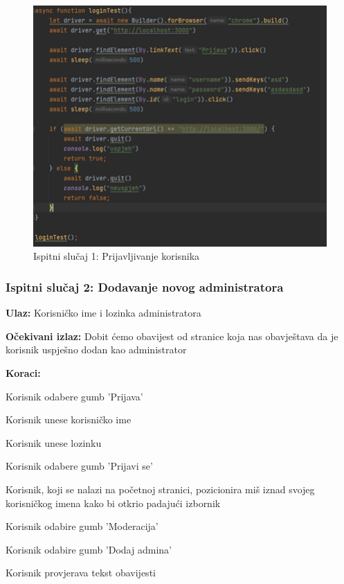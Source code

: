 			 \begin{figure}[H]
			 	\centering
			 	\includegraphics[width=12cm]{slike/prijavljivanjeKorisnika}
			 	\caption{Ispitni slučaj 1: Prijavljivanje korisnika}
			 	\label{fig:Ispitni-slucaj-1}
			 \end{figure}
		 
		 	\subsubsection{Ispitni slučaj 2: Dodavanje novog administratora}
		 	
		 	\begin{packed_item}
		 		
		 		\item \textbf{Ulaz: } Korisničko ime i lozinka administratora 
		 		\item  \textbf{Očekivani izlaz:} Dobit ćemo obavijest od stranice koja nas obavještava da je korisnik uspješno dodan kao administrator
		 		\item  \textbf{Koraci:}
		 		
		 		\item[] \begin{packed_enum}
		 			
		 			\item Korisnik odabere gumb 'Prijava'
		 			\item Korisnik unese korisničko ime
		 			\item Korisnik unese lozinku
		 			\item Korisnik odabere gumb 'Prijavi se'
		 			\item Korisnik, koji se nalazi na početnoj stranici, pozicionira miš iznad svojeg korisničkog imena kako bi otkrio padajući izbornik
		 			\item Korisnik odabire gumb 'Moderacija'
		 			\item Korisnik odabire gumb 'Dodaj admina'
		 			\item Korisnik provjerava tekst obavijesti
		 			
		 		\end{packed_enum}
		 	\end{packed_item}
		 	
